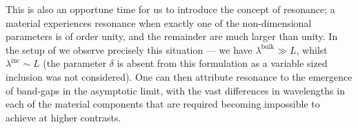 This is also an opportune time for us to introduce the concept of resonance; a material experiences resonance when exactly one of the non-dimensional parameters is of order unity, and the remainder are much larger than unity.
In the setup of \cite{hempel2000spectral} we observe precisely this situation --- we have $\lambda^{\mathrm{bulk}}\gg L$, whilst $\lambda^{\mathrm{inc}}\sim L$ (the parameter $\delta$ is absent from this formulation as a variable sized inclusion was not considered).
One can then attribute resonance to the emergence of band-gaps  in the asymptotic limit, with the vast differences in wavelengths in each of the material components that are required becoming impossible to achieve at higher contrasts.

